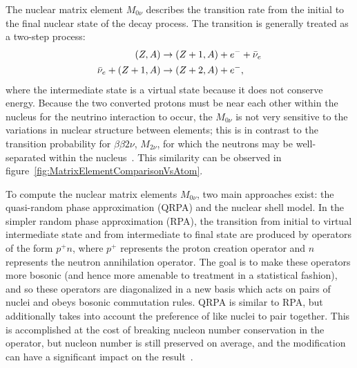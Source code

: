 The nuclear matrix element $M_{0\nu}$ describes the transition rate from the initial to the final nuclear state of the decay process.  The transition is generally treated as a two-step process:
\begin{align}
(Z,A) &\rightarrow (Z+1,A) + e^{-} + \bar{\nu}_e \notag \\
\bar{\nu}_e + (Z+1,A) &\rightarrow (Z+2,A) + e^{-},
\end{align}
where the intermediate state is a virtual state because it does not conserve energy.  Because the two converted protons must be near each other within the nucleus for the neutrino interaction to occur, the $M_{0\nu}$ is not very sensitive to the variations in nuclear structure between elements; this is in contrast to the transition probability for $\beta\beta 2\nu$, $M_{2\nu}$, for which the neutrons may be well-separated within the nucleus~\cite{PetrVogel0nuAnd2nuMatrixElements}.  This similarity can be observed in figure~\ref{fig:MatrixElementComparisonVsAtom}.


To compute the nuclear matrix elements $M_{0\nu}$, two main approaches exist: the quasi-random phase approximation (QRPA) and the nuclear shell model.  In the simpler random phase approximation (RPA), the transition from initial to virtual intermediate state and from intermediate to final state are produced by operators of the form $p^+ n$, where $p^+$ represents the proton creation operator and $n$ represents the neutron annihilation operator.  The goal is to make these operators more bosonic (and hence more amenable to treatment in a statistical fashion), and so these operators are diagonalized in a new basis which acts on pairs of nuclei and obeys bosonic commutation rules.  QRPA is similar to RPA, but additionally takes into account the preference of like nuclei to pair together.  This is accomplished at the cost of breaking nucleon number conservation in the operator, but nucleon number is still preserved on average, and the modification can have a significant impact on the result~\cite{RMPbb0n}.

